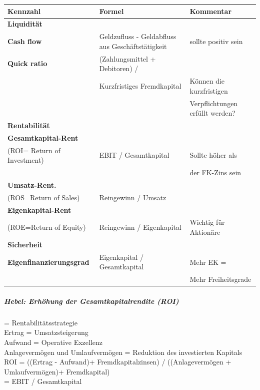 \documentclass[../ZF_Wing.tex]{subfiles}
\begin{document}
\begin{table}[H]
\begin{tabular}{l|l|l}
\colorbox{blue!10}{\textbf{Kennzahl}} & \colorbox{blue!10}{\textbf{Formel}} & \colorbox{blue!10}{\textbf{Kommentar}} \\
\hline
\colorbox{teal!30} {\textbf{Liquidität}} \\
\hline
\textbf{Cash flow} & Geldzufluss - Geldabfluss aus Geschäftstätigkeit & sollte positiv sein\\
\hline
\textbf{Quick ratio} & (Zahlungsmittel + Debitoren) / \\& Kurzfristiges Fremdkapital & Können die kurzfristigen\\
&& Verpflichtungen erfüllt werden?\\
\hline
\colorbox{teal!30} {\textbf{Rentabilität}} \\
\hline
\textbf{Gesamtkapital-Rent}\\(ROI= Return of Investment) & EBIT / Gesamtkapital & Sollte höher als\\&& der FK-Zins sein\\
\hline
\textbf{Umsatz-Rent.}\\(ROS=Return of Sales) & Reingewinn / Umsatz \\
\hline
\textbf{Eigenkapital-Rent}\\(ROE=Return of Equity)& Reingewinn / Eigenkapital & Wichtig für Aktionäre\\
\hline
\colorbox{teal!30} {\textbf{Sicherheit}}\\
\hline
\textbf{Eigenfinanzierungsgrad} & Eigenkapital / Gesamtkapital & Mehr EK =\\&& Mehr Freiheitsgrade\\
\hline
\end{tabular}
\end{table}


\subparagraph{Hebel: Erhöhung der Gesamtkapitalrendite (ROI)\\}
= Rentabilitätsstrategie\\

Ertrag = Umsatzsteigerung\\
Aufwand = Operative Exzellenz\\
Anlagevermögen und Umlaufvermögen = Reduktion des investierten Kapitals\\

ROI = ((Ertrag - Aufwand)+ Fremdkapitalzinsen) / ((Anlagevermögen + Umlaufvermögen)+ Fremdkapital)\\
= EBIT  / Gesamtkapital
\end{document}
